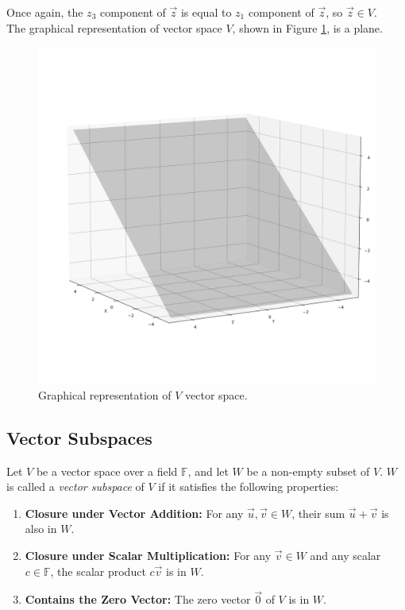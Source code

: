Once again, the $z_3$ component of $\vec z$ is equal to $z_1$ component of $\vec z$, so $\vec z \in V$.
\\

The graphical representation of vector space $V$, shown in Figure \ref{fig:vector-space-ex}, is a plane.

\begin{figure}[h]
    \centering
    \includegraphics[scale=0.39]{Images/vector-space-ex.png}
    \caption{Graphical representation of $V$ vector space.}
    \label{fig:vector-space-ex}
\end{figure}

\subsection{Vector Subspaces}

Let $V$ be a vector space over a field $\mathbb{F}$, and let $W$ be a non-empty subset of $V$. $W$ is called a \emph{vector subspace} of $V$ if it satisfies the following properties:

\begin{enumerate}
    \item \textbf{Closure under Vector Addition:} For any $\vec{u}, \vec{v} \in W$, their sum $\vec{u} + \vec{v}$ is also in $W$.
    
    \item \textbf{Closure under Scalar Multiplication:} For any $\vec{v} \in W$ and any scalar $c \in \mathbb{F}$, the scalar product $c\vec{v}$ is in $W$.
    
    \item \textbf{Contains the Zero Vector:} The zero vector $\vec{0}$ of $V$ is in $W$.
\end{enumerate}

